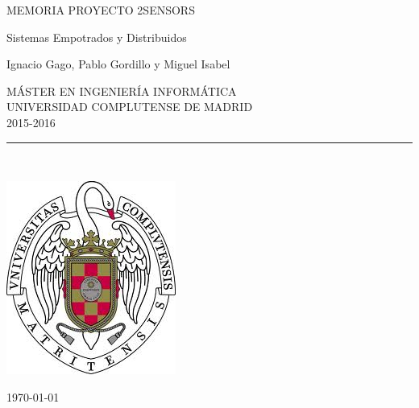 \begin{center}

   \vspace{1cm}


   {\Large MEMORIA PROYECTO 2SENSORS}\\

   \vspace{0.5cm}

   {\Large Sistemas Empotrados y Distribuidos }\\

   \vspace{0.5cm}




   {\large Ignacio Gago, Pablo Gordillo y Miguel Isabel}\\

   \vspace{0.5cm}




   M\'ASTER EN INGENIER\'IA INFORM\'ATICA\\
   UNIVERSIDAD COMPLUTENSE DE MADRID \\
   2015-2016\\


   \vspace{0.65cm}
   \rule{2in}{0.5pt}\\
   \vspace{0.85cm}

  \includegraphics[height=2.5in]{escudo.jpg}
  

   \vspace{0.5cm}


   \vspace{0.5cm}






   \today \\
   \vspace{1cm}

\end{center}


